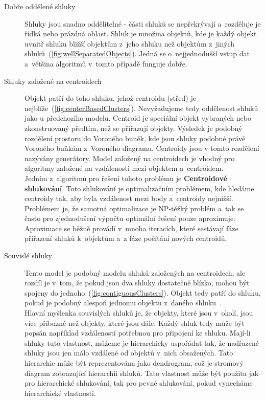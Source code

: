 \begin{description}
\item[Dobře oddělené shluky] Shluky jsou snadno oddělitelné - části shluků se ne\-pře\-krý\-va\-jí a~rozděluje je řídká nebo prázdná oblast. Shluk je množina objektů, kde je každý objekt uvnitř shluku bližší objektům z~jeho shluku než objektům z~jiných shluků~(\autoref{fig:wellSeparatedObjects}). Jedná se o~nejjednodušší vstup dat a~většina algoritmů v~tomto případě funguje dobře.

\item[Shluky založené na centroidech] Objekt patří do toho shluku, jehož centroidu (střed) je nejblíže~(\autoref{fig:centerBasedClusters}). Nevyžadujeme tedy oddělenost shluků jako u předchozího modelu. Centroid je speciální objekt vybraných nebo zkonstruovaný předtím, než se přiřazují objekty. Výsledek je podobný rozdělení prostoru do Voroného buněk, kde jsou shluky podobné právě Voroného buňkám z~Voroného diagramu. Centroidy jsou v tomto rozdělení nazývány generátory. Model založený na centroidech je vhodný pro algoritmy založené na vzdálenosti mezi objektem a~centroidem.\\

Jedním z~algoritmů pro řešení tohoto problému je \textbf{Centroidové shlukování}. Toto shlukování je optimalizačním problémem, kde hledáme centroidy tak, aby byla vzdálenost mezi body a~centroidy nejnižší. Problémem je, že samotná optimalizace je NP-těžký problém a~tak se často pro zjednodušení výpočtu optimální řešení pouze aproximuje. Aproximace se běžně provádí v~mnoha iteracích, které sestávají fáze přiřazení shluků k~objektům a~z fáze počítání nových centroidů.

\item[Souvislé shluky] Tento model je podobný modelu shluků založených na centroidech, ale rozdíl je v~tom, že pokud jsou dva shluky dostatečně blízko, mohou být spojeny do jednoho~(\autoref{fig:contiguousClusters}). Objekt tedy patří do shluku, pokud je podobný alespoň jednomu objektu z~daného shluku~\cite{Tan05}. \\

Hlavní myšlenka souvislých shluků je, že objekty, které jsou v~okolí, jsou více příbuzné než objekty, které jsou dále. Každý shluk tedy může být popsán například vzdáleností potřebnou pro připojení ke shluku. Mají-li shluky tuto vlastnost, můžeme je hierarchicky uspořádat tak, že nadřazené shluky jsou jen málo vzdálené od objektů v~nich obsažených. Tato hierarchie může být reprezentována jako dendrogram, což je stromový diagram zobrazující hierarchii shluků. Tato vlastnost může být použita jak pro hierarchické shlukování, tak pro pevné shlukování, pokud vynecháme hierarchické vlastnosti. \\


\end{description}
